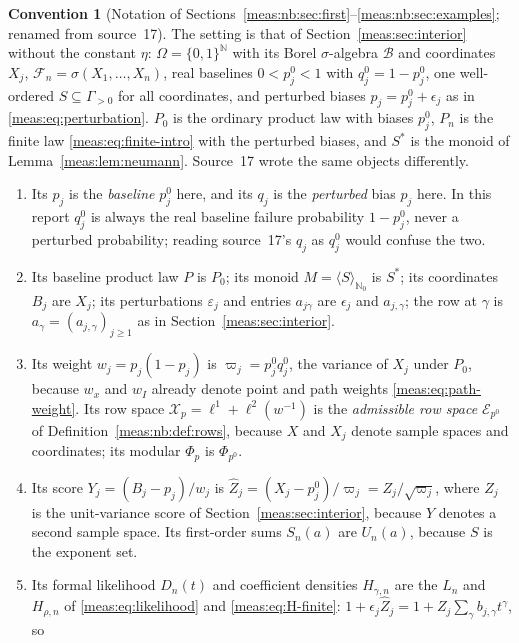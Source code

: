\documentclass[11pt]{article}
\numberwithin{equation}{section}
\theoremstyle{definition}
\newtheorem{convention}[theorem]{Convention}
\theoremstyle{remark}
\newcommand{\N}{\mathbb N}
\newcommand{\B}{\mathcal B}
\newcommand{\Zh}{\widehat Z}
\newcommand{\Erow}{\mathcal E_{p^0}}
\begin{document}
\begin{convention}[Notation of
Sections~\ref{meas:nb:sec:first}--\ref{meas:nb:sec:examples}; renamed from
source~17]\label{meas:nb:conv:notation}
The setting is that of Section~\ref{meas:sec:interior} without the constant
$\eta$: $\Omega=\{0,1\}^{\N}$ with its Borel $\sigma$-algebra $\B$ and coordinates
$X_j$, $\mathcal F_n=\sigma(X_1,\ldots,X_n)$, real baselines $0<p_j^0<1$ with
$q_j^0=1-p_j^0$, one well-ordered $S\subseteq\Gamma_{>0}$ for all coordinates, and
perturbed biases $p_j=p_j^0+\epsilon_j$ as in \eqref{meas:eq:perturbation}. $P_0$ is
the ordinary product law with biases $p_j^0$, $P_n$ is the finite law
\eqref{meas:eq:finite-intro} with the perturbed biases, and $S^*$ is the monoid of
Lemma~\ref{meas:lem:neumann}. Source~17 wrote the same objects differently.
\begin{enumerate}[label=(\alph*)]
\item Its $p_j$ is the \emph{baseline} $p_j^0$ here, and its $q_j$ is the
\emph{perturbed} bias $p_j$ here. In this report $q_j^0$ is always the real
baseline failure probability $1-p_j^0$, never a perturbed probability; reading
source~17's $q_j$ as $q_j^0$ would confuse the two.
\item Its baseline product law $P$ is $P_0$; its monoid
$M=\langle S\rangle_{\N_0}$ is $S^*$; its coordinates $B_j$ are $X_j$; its
perturbations $\varepsilon_j$ and entries $a_{j\gamma}$ are $\epsilon_j$ and
$a_{j,\gamma}$; the row at $\gamma$ is $a_\gamma=(a_{j,\gamma})_{j\ge1}$ as in
Section~\ref{meas:sec:interior}.
\item Its weight $w_j=p_j(1-p_j)$ is $\varpi_j=p_j^0q_j^0$, the variance of $X_j$
under $P_0$, because $w_x$ and $w_I$ already denote point and path weights
\eqref{meas:eq:path-weight}. Its row space $\mathcal X_p=\ell^1+\ell^2(w^{-1})$ is the
\emph{admissible row space} $\Erow$ of Definition~\ref{meas:nb:def:rows}, because
$X$ and $X_j$ denote sample spaces and coordinates; its modular $\Phi_p$ is
$\Phi_{p^0}$.
\item Its score $Y_j=(B_j-p_j)/w_j$ is $\Zh_j=(X_j-p_j^0)/\varpi_j=Z_j/\sqrt{\varpi_j}$,
where $Z_j$ is the unit-variance score of Section~\ref{meas:sec:interior}, because
$Y$ denotes a second sample space. Its first-order sums $S_n(a)$ are $U_n(a)$,
because $S$ is the exponent set.
\item Its formal likelihood $D_n(t)$ and coefficient densities $H_{\gamma,n}$ are
the $L_n$ and $H_{\rho,n}$ of \eqref{meas:eq:likelihood} and
\eqref{meas:eq:H-finite}: $1+\epsilon_j\Zh_j=1+Z_j\sum_\gamma b_{j,\gamma}t^\gamma$, so

\end{enumerate}
\end{convention}
\end{document}
